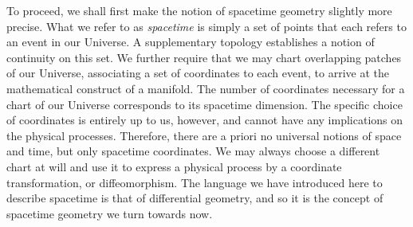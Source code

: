 To proceed, we shall first make the notion of spacetime geometry slightly more precise. What we refer to as \emph{spacetime} is simply a set of points that each refers to an event in our Universe. A supplementary topology establishes a notion of continuity on this set. We further require that we may chart overlapping patches of our Universe, associating a set of coordinates to each event, to arrive at the mathematical construct of a manifold. The number of coordinates necessary for a chart of our Universe corresponds to its spacetime dimension. The specific choice of coordinates is entirely up to us, however, and cannot have any implications on the physical processes. Therefore, there are a priori no universal notions of space and time, but only spacetime coordinates. We may always choose a different chart at will and use it to express a physical process by a coordinate transformation, or diffeomorphism. The language we have introduced here to describe spacetime is that of differential geometry, and so it is the concept of spacetime geometry we turn towards now.


